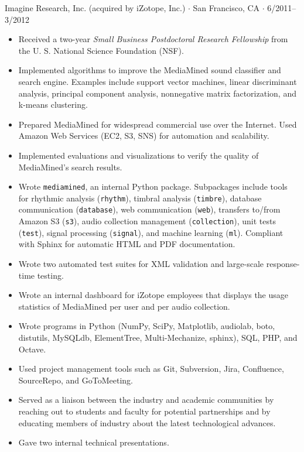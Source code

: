 \documentclass[10pt,letterpaper]{article}
\begin{document}
Imagine Research, Inc. (acquired by iZotope, Inc.) $\cdot$ San Francisco, CA $\cdot$ 6/2011--3/2012
\begin{itemize}
    \item Received a two-year \textit{Small Business Postdoctoral Research Fellowship} from the U. S. National Science Foundation (NSF).
    \item Implemented algorithms to improve the MediaMined sound classifier and search engine. Examples include support vector machines, linear discriminant analysis, principal component analysis, nonnegative matrix factorization, and k-means clustering.
    \item Prepared MediaMined for widespread commercial use over the Internet. Used Amazon Web Services (EC2, S3, SNS) for automation and scalability.
    \item Implemented evaluations and visualizations to verify the quality of MediaMined's search results.
    \item Wrote \texttt{mediamined}, an internal Python package. Subpackages include tools for rhythmic analysis (\texttt{rhythm}), timbral analysis (\texttt{timbre}), database communication (\texttt{database}), web communication (\texttt{web}), transfers to/from Amazon S3 (\texttt{s3}), audio collection management (\texttt{collection}), unit tests (\texttt{test}), signal processing (\texttt{signal}), and machine learning (\texttt{ml}). Compliant with Sphinx for automatic HTML and PDF documentation.
    \item Wrote two automated test suites for XML validation and large-scale response-time testing.
    \item Wrote an internal dashboard for iZotope employees that displays the usage statistics of MediaMined per user and per audio collection.
    \item Wrote programs in Python (NumPy, SciPy, Matplotlib, audiolab, boto, distutils, MySQLdb, ElementTree, Multi-Mechanize, sphinx), SQL, PHP, and Octave.
    \item Used project management tools such as Git, Subversion, Jira, Confluence, SourceRepo, and GoToMeeting.
    \item Served as a liaison between the industry and academic communities by reaching out to students and faculty for potential partnerships and by educating members of industry about the latest technological advances.
    \item Gave two internal technical presentations.
\end{itemize}
\end{document}

